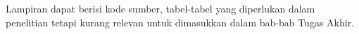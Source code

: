 Lampiran dapat berisi kode sumber, tabel-tabel yang diperlukan dalam penelitian tetapi kurang relevan untuk dimasukkan dalam bab-bab Tugas Akhir.

